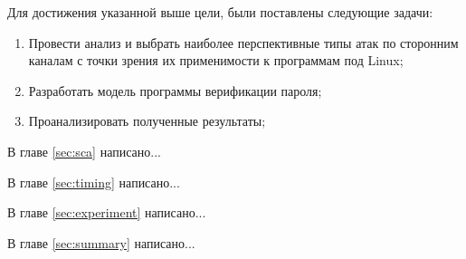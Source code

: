 Для достижения указанной выше цели, были поставлены следующие задачи:
\begin{enumerate}
\item Провести анализ и выбрать наиболее перспективные типы атак по сторонним
  каналам с точки зрения их применимости к программам под Linux;
\item Разработать модель программы верификации пароля;
\item Проанализировать полученные результаты;
\end{enumerate}

В главе \ref{sec:sca} написано...

В главе \ref{sec:timing} написано...

В главе \ref{sec:experiment} написано...

В главе \ref{sec:summary} написано...

\clearpage
